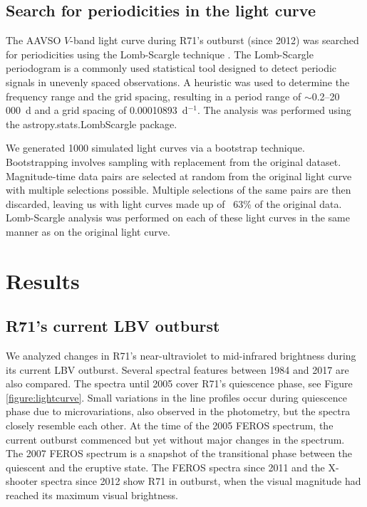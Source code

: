 \documentclass[structabstract]{aa}
\begin{document}
\subsection{Search for periodicities in the light curve}

The AAVSO $V$-band light curve during R71's outburst (since 2012) was searched for periodicities using the Lomb-Scargle technique \citep{1976Ap&SS..39..447L,1982ApJ...263..835S}. The Lomb-Scargle periodogram is a commonly used statistical tool designed to detect periodic signals in unevenly spaced observations. A heuristic was used to determine the frequency range and the grid spacing, resulting in a period range of $\sim$0.2--20\,000~d and a grid spacing of 0.00010893~d$^{-1}$. The analysis was performed using the \textsf{astropy.stats.LombScargle} package.

We generated 1000 simulated light curves via a bootstrap technique. Bootstrapping involves sampling with replacement from the original dataset. Magnitude-time data pairs are selected at random from the original light curve with multiple selections possible. Multiple selections of the same pairs are then discarded, leaving us with light curves made up of ~63\% of the original data. Lomb-Scargle analysis was performed on each of these light curves in the same manner as on the original light curve. 


\section{Results}
\label{results}

\subsection{R71's current LBV outburst}
\label{results:eruption}


We analyzed changes in R71's near-ultraviolet to mid-infrared brightness during its current LBV outburst. Several spectral features between 1984 and 2017 are also compared. The spectra until 2005 cover R71's quiescence phase, see Figure \ref{figure:lightcurve}. Small variations in the line profiles occur during quiescence phase due to microvariations, also observed in the photometry, but the spectra closely resemble each other. At the time of the 2005 FEROS spectrum, the current outburst commenced but yet without major changes in the spectrum. 
The 2007 FEROS spectrum is a snapshot of the transitional phase between the quiescent and the eruptive state. The FEROS spectra since 2011 and the X-shooter spectra since 2012 show R71 in outburst, when the visual magnitude had reached its maximum visual brightness. 
\end{document}
